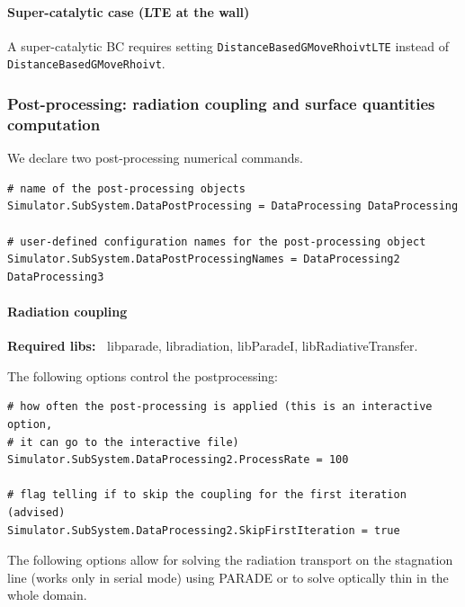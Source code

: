 \documentclass[11pt]{article}
\begin{document}
\paragraph{Super-catalytic case (LTE at the wall)}

A super-catalytic BC requires setting {\tt DistanceBasedGMoveRhoivtLTE} instead of  
{\tt DistanceBasedGMoveRhoivt}.

\subsubsection{Post-processing: radiation coupling and surface quantities computation}

We declare two post-processing numerical commands.

\begin{lstlisting}[breaklines]
# name of the post-processing objects
Simulator.SubSystem.DataPostProcessing = DataProcessing DataProcessing

# user-defined configuration names for the post-processing object 
Simulator.SubSystem.DataPostProcessingNames = DataProcessing2 DataProcessing3
\end{lstlisting}

\paragraph{Radiation coupling}

{\bf Required libs:~} libparade, libradiation, libParadeI, libRadiativeTransfer.

The following options control the postprocessing:

\begin{lstlisting}[breaklines]
# how often the post-processing is applied (this is an interactive option, 
# it can go to the interactive file)
Simulator.SubSystem.DataProcessing2.ProcessRate = 100

# flag telling if to skip the coupling for the first iteration (advised)
Simulator.SubSystem.DataProcessing2.SkipFirstIteration = true
\end{lstlisting}

The following options allow for solving the radiation transport on the stagnation line (works only in serial mode) 
using PARADE or to solve optically thin in the whole domain.
\end{document}
